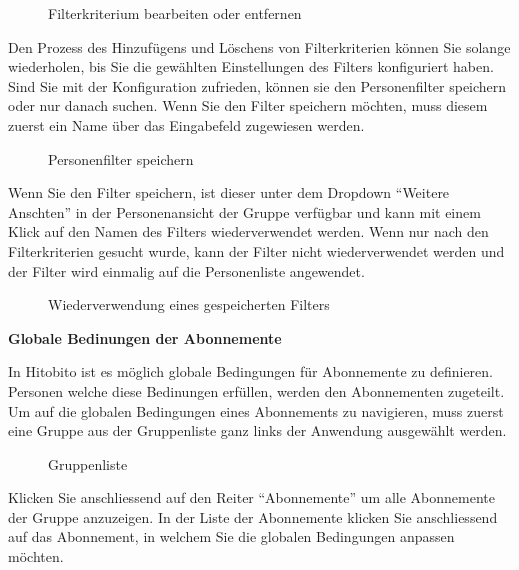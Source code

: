 \begin{figure}[h]
   \centering
   \caption{Filterkriterium bearbeiten oder entfernen}
\end{figure}

Den Prozess des Hinzufügens und Löschens von Filterkriterien können Sie solange wiederholen, bis Sie die gewählten
Einstellungen des Filters konfiguriert haben. Sind Sie mit der Konfiguration zufrieden, können sie den Personenfilter speichern oder
nur danach suchen. Wenn Sie den Filter speichern möchten, muss diesem zuerst ein Name über das Eingabefeld zugewiesen werden.

\begin{figure}[h]
   \centering
   \caption{Personenfilter speichern}
\end{figure}

\newpage

Wenn Sie den Filter speichern, ist dieser unter dem Dropdown ``Weitere Anschten'' in der Personenansicht der Gruppe verfügbar und
kann mit einem Klick auf den Namen des Filters wiederverwendet werden. Wenn nur nach den Filterkriterien gesucht wurde, kann der Filter nicht 
wiederverwendet werden und der Filter wird einmalig auf die Personenliste angewendet.

\begin{figure}[h]
   \centering
   \caption{Wiederverwendung eines gespeicherten Filters}
\end{figure}

\newpage

\textbf{Globale Bedinungen der Abonnemente}

In Hitobito ist es möglich globale Bedingungen für Abonnemente zu definieren. Personen welche diese Bedinungen erfüllen, 
werden den Abonnementen zugeteilt. Um auf die globalen Bedingungen eines Abonnements zu navigieren, muss zuerst eine Gruppe aus der Gruppenliste
ganz links der Anwendung ausgewählt werden. 

\begin{figure}[h]
   \centering
   \caption{Gruppenliste}
\end{figure}

Klicken Sie anschliessend auf den Reiter ``Abonnemente'' um alle Abonnemente der Gruppe anzuzeigen. 
In der Liste der Abonnemente klicken Sie anschliessend auf das Abonnement, in welchem Sie die globalen Bedingungen anpassen möchten.

